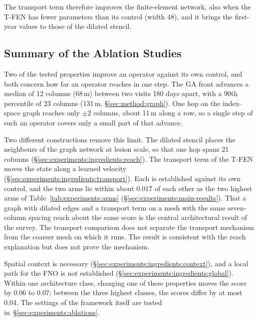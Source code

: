 The transport term therefore improves the finite-element network, also
when the T-FEN has fewer parameters than its control (width 48), and it
brings the first-year values to those of the dilated stencil.

\subsection{Summary of the Ablation Studies}
\label{sec:experiments:ingredients:convergence}

Two of the tested properties improve an operator against its own control,
and both concern how far an operator reaches in one step. The GA front
advances a median of 12 columns (68\,\textmu{}m) between two visits 180
days apart, with a 90th percentile of 23 columns (131\,\textmu{}m,
\S\ref{sec:method:graph}). One hop on
the index-space graph reaches only $\pm 2$ columns, about 11\,\textmu{}m
along a row, so a single step of such an operator covers only a small part
of that advance.

Two different constructions remove this limit. The dilated stencil places
the neighbours of the graph network at lesion scale, so that one hop spans
21 columns (\S\ref{sec:experiments:ingredients:reach}). The transport term
of the T-FEN moves the state along a learned velocity
(\S\ref{sec:experiments:ingredients:transport}). Each is established
against its own control, and the two arms lie within about 0.017 of each
other as the two highest arms of Table~\ref{tab:experiments:arms}
(\S\ref{sec:experiments:main-results}). That a graph with dilated edges and
a transport term on a mesh with the same seven-column spacing reach about
the same score is the central architectural result of the survey. The
transport comparison does not separate the transport mechanism from the
coarser mesh on which it runs. The result is consistent with the reach
explanation but does not prove the mechanism.

Spatial context is necessary (\S\ref{sec:experiments:ingredients:context}),
and a local path for the FNO is not established
(\S\ref{sec:experiments:ingredients:global}). Within one architecture
class, changing one of these properties moves the score by 0.06 to 0.07;
between the three highest classes, the scores differ by at most 0.04. The
settings of the framework itself are tested
in~\S\ref{sec:experiments:ablations}.


